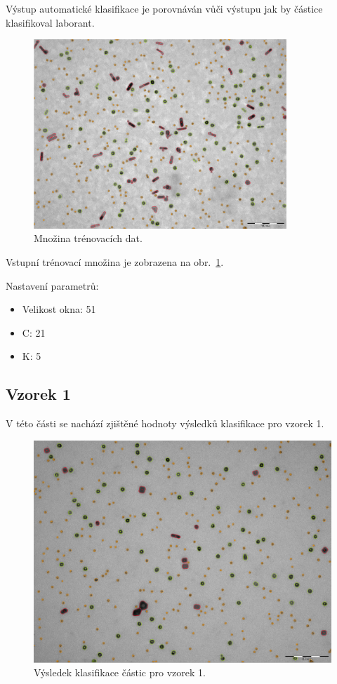 \documentclass[11pt,twoside,a4paper,table]{book}
\begin{document}
Výstup automatické klasifikace je porovnáván vůči výstupu jak by částice klasifikoval laborant.

\begin{figure}[hp]
	\centering
	\includegraphics[width=0.85\textwidth]{figures/multi5_klasifikace.png}
	\caption{Množina trénovacích dat.}
	\label{fig:class_input}
\end{figure}

Vstupní trénovací množina je zobrazena na obr.~\ref{fig:class_input}.

Nastavení parametrů:
\begin{itemize}
	\item Velikost okna: 51
	\item C: 21
	\item K: 5 
\end{itemize}

\newpage
\FloatBarrier
\subsection{Vzorek 1}
V této části se nachází zjištěné hodnoty výsledků klasifikace pro vzorek 1.

\begin{figure}[h!]
\begin{center}
\includegraphics[width=\textwidth]{figures/multi1_klasifikace.png}
\end{center}
\label{fig:class1}
\caption{Výsledek klasifikace částic pro vzorek 1.}
\end{figure}
\end{document}
